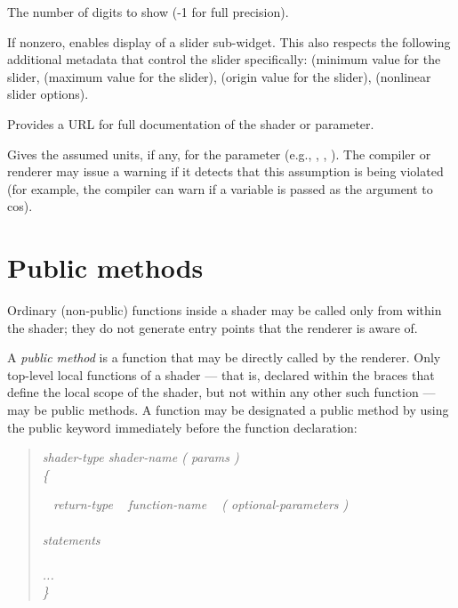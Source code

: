 \documentclass[11pt,letterpaper]{book}
\begin{document}
The number of digits to show (-1 for full precision).
\apiend

If nonzero, enables display of a slider sub-widget.  This also respects
the following additional metadata that control the slider specifically:
 (minimum value for the slider,  (maximum
value for the slider),  (origin value for
the slider),  (nonlinear slider options).
\apiend

Provides a URL for full documentation of the shader or parameter.
\apiend

Gives the assumed units, if any, for the parameter (e.g., ,
, ).
The compiler or renderer may issue a warning if it detects that this
assumption is being violated (for example, the compiler can warn
if a  variable is passed as the argument to {\cf cos}).
\apiend





\newpage
\section{Public methods}
\label{sec:publicmethods}

Ordinary (non-public) functions inside a shader may be called only from
within the shader; they do not generate entry points that the renderer
is aware of.

A \emph{public method} is a function that may be directly called by the
renderer.  Only top-level local functions of a shader --- that is,
declared within the braces that define the local scope of the shader,
but not within any other such function --- may be public methods.  A
function may be designated a public method by using the {\cf public}
keyword immediately before the function declaration:

\begin{quote}
\em shader-type shader-name ( params ) \\
{\rm\cf \{}

 \em ~ return-type ~ function-name ~ {\rm \cf (}
optional-parameters {\rm \cf )} \\
\spc {\rm \cf \{ } \\
\spc\spc statements \\
\spc {\rm \cf \} } \\

\spc ...\\
{\rm\cf \}}
\end{quote}
\end{document}
